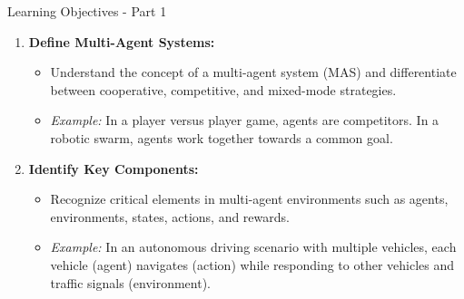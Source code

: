 \documentclass[aspectratio=169]{beamer}
\begin{document}
\begin{frame}[fragile]{Learning Objectives - Part 1}
    \begin{enumerate}
        \item \textbf{Define Multi-Agent Systems:} 
        \begin{itemize}
            \item Understand the concept of a multi-agent system (MAS) and differentiate between cooperative, competitive, and mixed-mode strategies.
            \item \textit{Example:} In a player versus player game, agents are competitors. In a robotic swarm, agents work together towards a common goal.
        \end{itemize}
        
        \item \textbf{Identify Key Components:} 
        \begin{itemize}
            \item Recognize critical elements in multi-agent environments such as agents, environments, states, actions, and rewards.
            \item \textit{Example:} In an autonomous driving scenario with multiple vehicles, each vehicle (agent) navigates (action) while responding to other vehicles and traffic signals (environment).
        \end{itemize}
    \end{enumerate}
\end{frame}
\end{document}
